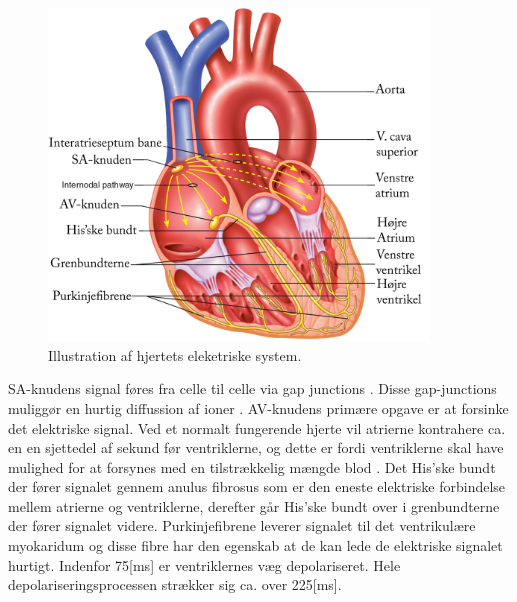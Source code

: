 \begin{figure}[H] %
\begin{center}
\includegraphics[width=0.9\textwidth]{figures/hjertet_elektriske}
\end{center}
\caption{Illustration af hjertets eleketriske system\cite{cindy}.}
\label{fig:hjerte_elektriske}
\end{figure}
\newpage
\noindent SA-knudens signal føres fra celle til celle via gap junctions \cite{gronanatomi}. Disse gap-junctions muliggør en hurtig diffussion af ioner \cite{guyton}. AV-knudens primære opgave er at  forsinke det elektriske signal. Ved et normalt fungerende hjerte vil atrierne kontrahere ca. en en sjettedel af sekund før ventriklerne, og dette er fordi ventriklerne skal have mulighed for at forsynes med en tilstrækkelig mængde blod \cite{guyton}. Det His'ske bundt der fører signalet gennem anulus fibrosus som er den eneste elektriske forbindelse mellem atrierne og ventriklerne, derefter går His'ske bundt over i grenbundterne der fører signalet videre. Purkinjefibrene leverer signalet til det ventrikulære myokaridum og disse fibre har den egenskab at de kan lede de elektriske signalet hurtigt. Indenfor 75[ms] er ventriklernes væg depolariseret. Hele depolariseringsprocessen strækker sig ca. over 225[ms]\cite{gronanatomi}.



